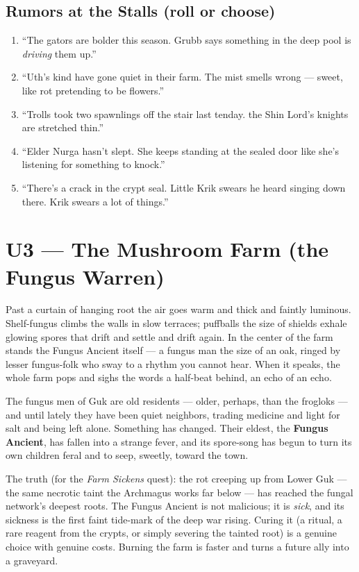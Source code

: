 \documentclass[10pt,twoside]{report}
\begin{document}
\subsection*{Rumors at the Stalls (roll or choose)}
\begin{enumerate}[leftmargin=1.6em,itemsep=1pt]
\item ``The gators are bolder this season. Grubb says something in the deep pool is \emph{driving} them up.''
\item ``Uth's kind have gone quiet in their farm. The mist smells wrong --- sweet, like rot pretending to be flowers.''
\item ``Trolls took two spawnlings off the stair last tenday. the Shin Lord's knights are stretched thin.''
\item ``Elder Nurga hasn't slept. She keeps standing at the sealed door like she's listening for something to knock.''
\item ``There's a crack in the crypt seal. Little Krik swears he heard singing down there. Krik swears a lot of things.''
\end{enumerate}

\section{U3 --- The Mushroom Farm (the Fungus Warren)}
\begin{readaloud}
Past a curtain of hanging root the air goes warm and thick and faintly luminous. Shelf-fungus climbs the walls in slow terraces; puffballs the size of shields exhale glowing spores that drift and settle and drift again. In the center of the farm stands the Fungus Ancient itself --- a fungus man the size of an oak, ringed by lesser fungus-folk who sway to a rhythm you cannot hear. When it speaks, the whole farm pops and sighs the words a half-beat behind, an echo of an echo.
\end{readaloud}

The fungus men of Guk are old residents --- older, perhaps, than the frogloks --- and until lately they have been quiet neighbors, trading medicine and light for salt and being left alone. Something has changed. Their eldest, the \textbf{Fungus Ancient}, has fallen into a strange fever, and its spore-song has begun to turn its own children feral and to seep, sweetly, toward the town.

\begin{gmnote}
The truth (for the \emph{Farm Sickens} quest): the rot creeping up from Lower Guk --- the same necrotic taint the Archmagus works far below --- has reached the fungal network's deepest roots. The Fungus Ancient is not malicious; it is \emph{sick}, and its sickness is the first faint tide-mark of the deep war rising. Curing it (a ritual, a rare reagent from the crypts, or simply severing the tainted root) is a genuine choice with genuine costs. Burning the farm is faster and turns a future ally into a graveyard.
\end{gmnote}
\end{document}
